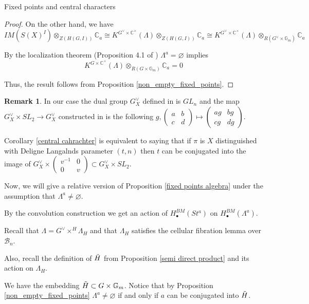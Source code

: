 \documentclass[12pt]{article}
\newcommand{\B}{\mathcal{B}}
\newcommand{\C}{\mathbb{C}}
\newcommand{\<}{\langle}
\renewcommand{\>}{\rangle}
\renewcommand{\emptyset}{\varnothing}
\theoremstyle{plain}
\theoremstyle{definition}
\newtheorem{Remark}[theorem]{Remark}
\begin{document}
\begin{section}{Fixed points and central characters}
\begin{proof}
    On the other hand, we have $$IM(S(X)^I)\otimes_{Z(H(G,I))} \C_a\cong K^{G^\vee\times \C^\times}(\Lambda)\otimes_{Z(H(G,I))} \C_a\cong  K^{G^\vee\times \C^\times}(\Lambda)\otimes_{R(G^\vee\times\mathbb{G}_m)} \C_a$$

    By the localization theorem (Proposition 4.1 of \cite{Segal1968EquivariantKTheory}) $\Lambda^a=\emptyset$ implies $$K^{G\times \C^\times}(\Lambda)\otimes_{R(G\times\mathbb{G}_m)} \C_a=0$$ 

    Thus, the result follows from Proposition \ref{non_empty_fixed_points}.
\end{proof}

\begin{Remark}
    In our case the dual group $G_X^\vee$ defined in \cite{Knop2017TheDG} is $GL_n$ and the map $G_X^\vee\times SL_2\rightarrow G_X^\vee$ constructed in \cite{Knop2017TheDG} is the following $g,\begin{pmatrix}
        a & b\\ c& d
    \end{pmatrix}\mapsto \begin{pmatrix}
        ag & bg\\ cg & dg
    \end{pmatrix}$. 

    Corollary \ref{central cahrachter} is equivalent to saying that if $\pi$ is $X$ distinguished with Deligne Langalnds parameter $(t,n)$ then $t$ can be conjugated into the image of $G_X^\vee\times\begin{pmatrix}
        v^{-1} &0\\0 & v
    \end{pmatrix}\subset G_X^\vee\times SL_2$. 
\end{Remark}


Now, we will give a relative version of Proposition \ref{fixed points algebra} under the assumption that $\Lambda^a\neq\emptyset$.

By the convolution construction we get an action of $H^{BM}_\bullet(St^a)$ on $H^{BM}_\bullet(\Lambda^a)$. 

Recall that $\Lambda=G^\vee\times^H \Lambda_H$ and that $\Lambda_H$ satisfies the cellular fibration lemma over $\B_n$. 

Also, recall the definition of $\Tilde{H}$ from Proposition \ref{semi direct product} and its action on $\Lambda_H$. 

We have the embedding $\Tilde{H}\subset G\times \mathbb{G}_m$. Notice that by Proposition \ref{non_empty_fixed_points} $\Lambda^a\neq\emptyset$ if and only if $a$ can be conjugated into $\Tilde{H}$.


\end{section}
\end{document}
